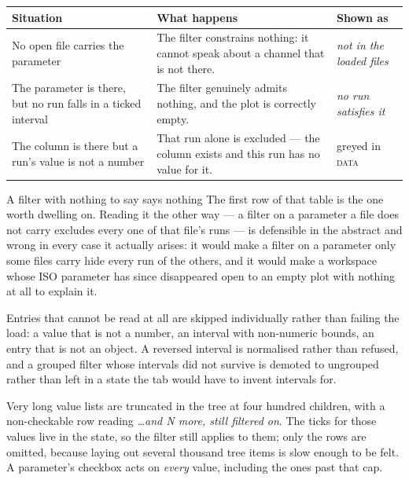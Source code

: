 \documentclass[11pt,a4paper,oneside]{report}
\newcommand{\tab}[1]{\textsc{#1}}
\begin{document}
\begin{center}
\small
\begin{tabular}{@{}p{}p{}p{}@{}}
\toprule
\textbf{Situation} & \textbf{What happens} & \textbf{Shown as} \\
\midrule
No open file carries the parameter & The filter constrains nothing: it cannot speak about a channel that is not there. & \emph{not in the loaded files} \\
\addlinespace
The parameter is there, but no run falls in a ticked interval & The filter genuinely admits nothing, and the plot is correctly empty. & \emph{no run satisfies it} \\
\addlinespace
The column is there but a run's value is not a number & That run alone is excluded --- the column exists and this run has no value for it. & greyed in \tab{data} \\
\bottomrule
\end{tabular}
\end{center}

\begin{aoenote}{A filter with nothing to say says nothing}
The first row of that table is the one worth dwelling on. Reading it the other
way --- a filter on a parameter a file does not carry excludes every one of that
file's runs --- is defensible in the abstract and wrong in every case it
actually arises: it would make a filter on a parameter only some files carry
hide every run of the others, and it would make a workspace whose ISO parameter
has since disappeared open to an empty plot with nothing at all to explain it.
\end{aoenote}

Entries that cannot be read at all are skipped individually rather than failing
the load: a value that is not a number, an interval with non-numeric bounds, an
entry that is not an object. A reversed interval is normalised rather than
refused, and a grouped filter whose intervals did not survive is demoted to
ungrouped rather than left in a state the tab would have to invent intervals for.

Very long value lists are truncated in the tree at four hundred children, with a
non-checkable row reading \emph{\ldots and N more, still filtered on}. The ticks
for those values live in the state, so the filter still applies to them; only the
rows are omitted, because laying out several thousand tree items is slow enough
to be felt. A parameter's checkbox acts on \emph{every} value, including the ones
past that cap.
\end{document}
